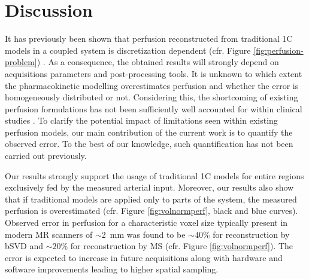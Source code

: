 \documentclass[aps,prb,article,groupedaddress,showkeys]{revtex4}
\begin{document}
	
	
	\section{Discussion}\label{sec:conclusion}

It has previously been shown that perfusion reconstructed from traditional 1C models in a coupled system is discretization dependent (cfr. Figure \ref{fig:perfusion-problem}) \cite{Henkelman1990,Guibert2013,sourbron14}. As a consequence, the obtained results will strongly depend on acquisitions parameters and post-processing tools. It is unknown to which extent the pharmacokinetic modelling overestimates perfusion and whether the error is homogeneously distributed or not. Considering this, the shortcoming of existing perfusion formulations has not been sufficiently well accounted for within clinical studies \cite{Mokin16,Kickingereder15}. To clarify the potential impact of limitations seen within existing perfusion models, our main contribution of the current work is to quantify the observed error. To the best of our knowledge, such quantification has not been carried out previously.

	Our results strongly support the usage of traditional 1C models for entire regions exclusively fed by the measured arterial input. Moreover, our results also show that if traditional models are applied only to parts of the system, the measured perfusion is overestimated (cfr. Figure \ref{fig:volnormperf}, black and blue curves). Observed error in perfusion for a characteristic voxel size typically present in modern MR scanners of $\sim$\SI{2}{\milli\meter} was found to be $\sim$$40\%$ for reconstruction by bSVD and $\sim$$20\%$ for reconstruction by MS (cfr. Figure \ref{fig:volnormperf}). The error is expected to increase in future acquisitions along with hardware and software improvements leading to higher spatial sampling.
		
\end{document}
